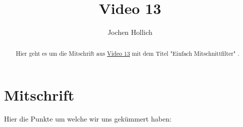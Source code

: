 \documentclass[]{article}
\title{Video 13}
\author{Jochen Hollich}
\begin{document}
\maketitle %

\begin{abstract}
Hier geht es um die Mitschrift aus \href{https://www.udemy.com/course/hacking-und-netzwerkanalyse-mit-wireshark-der-komplettkurs/learn/lecture/6851614#overview}{Video 13} mit dem Titel "Einfach Mitschnittfilter" .
\end{abstract}

\newpage

\section{Mitschrift}
Hier die Punkte um welche wir uns gekümmert haben:
\end{document}
